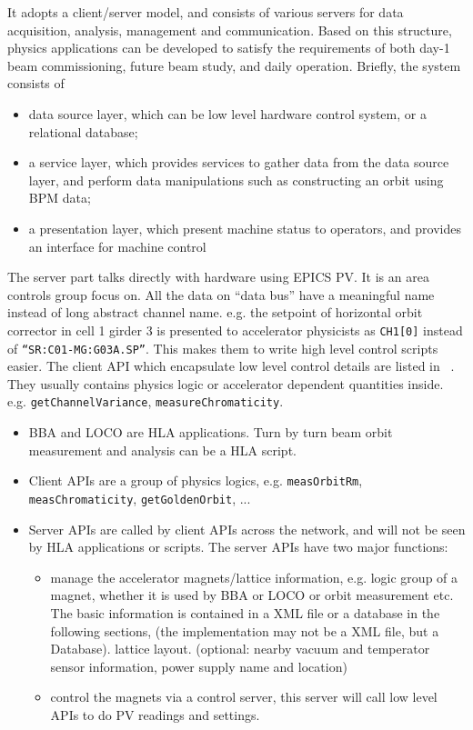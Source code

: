 \documentclass[11pt,oneside,letterpaper,showtrims,article]{memoir}
\newcommand{\code}[1]{\texttt{#1}}
\begin{document}
It adopts a client/server model, and consists of various servers for data
acquisition, analysis, management and communication. Based on this
structure, physics applications can be developed to satisfy the
requirements of both day-1 beam commissioning, future beam study, and
daily operation.  Briefly, the system consists of
\begin{itemize}
\item data source layer, which can be low level hardware control system,
  or a relational database;
\item a service layer, which provides services to gather data from the
  data source layer, and perform data manipulations such as constructing
  an orbit using BPM data;
\item a presentation layer, which present machine status to operators, and
  provides an interface for machine control
\end{itemize}

The server part talks directly with hardware using EPICS PV. It is an area
controls group focus on. All the data on ``data bus'' have a meaningful
name instead of long abstract channel name. e.g. the setpoint of
horizontal orbit corrector in cell 1 girder 3 is presented to accelerator
physicists as \code{CH1[0]} instead of \code{``SR:C01-MG:G03A.SP''}. This
makes them to write high level control scripts easier. The client API
which encapsulate low level control details are listed in
~\cite{shen_hla_apis}. They usually contains physics logic or accelerator
dependent quantities inside. e.g. \code{getChannelVariance},
\code{measureChromaticity}.

\begin{itemize}
\item BBA and LOCO are HLA applications. Turn by turn beam orbit
  measurement and analysis can be a HLA script.
\item Client APIs are a group of physics logics, e.g. \code{measOrbitRm},
  \code{measChromaticity}, \code{getGoldenOrbit}, ...
\item Server APIs are called by client APIs across the network, and will
  not be seen by HLA applications or scripts. The server APIs have two
  major functions:
  \begin{itemize}%
  \item manage the accelerator magnets/lattice information, e.g. logic
    group of a magnet, whether it is used by BBA or LOCO or orbit
    measurement etc. The basic information is contained in a XML file or a
    database in the following sections, (the implementation may not be a
    XML file, but a Database). lattice layout. (optional: nearby vacuum
    and temperator sensor information, power supply name and location)
  \item control the magnets via a control server, this server will call
    low level APIs to do PV readings and settings.
  \end{itemize}
\end{itemize}
\end{document}
